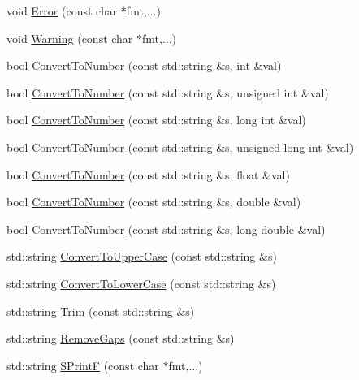 \begin{DoxyCompactItemize}
\item 
void \hyperlink{namespace_c_o_n_t_r_a_l_i_g_n_a61966034d786cea05ffcfaf94857102b}{Error} (const char $\ast$fmt,...)
\item 
void \hyperlink{namespace_c_o_n_t_r_a_l_i_g_n_ac0f0da01d76aab8602edcd2e4defc15f}{Warning} (const char $\ast$fmt,...)
\item 
bool \hyperlink{namespace_c_o_n_t_r_a_l_i_g_n_a7d8b6bc69c474546641aca733a1ba0db}{Convert\+To\+Number} (const std\+::string \&s, int \&val)
\item 
bool \hyperlink{namespace_c_o_n_t_r_a_l_i_g_n_a7da237d8ce22882695f3c123458b86cc}{Convert\+To\+Number} (const std\+::string \&s, unsigned int \&val)
\item 
bool \hyperlink{namespace_c_o_n_t_r_a_l_i_g_n_a35c60ce0193bd02ab62b2a7a88cf28f8}{Convert\+To\+Number} (const std\+::string \&s, long int \&val)
\item 
bool \hyperlink{namespace_c_o_n_t_r_a_l_i_g_n_a6329df40493ff670585d485a8fa113c8}{Convert\+To\+Number} (const std\+::string \&s, unsigned long int \&val)
\item 
bool \hyperlink{namespace_c_o_n_t_r_a_l_i_g_n_af5c3734e0fb093eab48cb799bae2aaf8}{Convert\+To\+Number} (const std\+::string \&s, float \&val)
\item 
bool \hyperlink{namespace_c_o_n_t_r_a_l_i_g_n_a3808e83d03092912e19aedeb45b7c691}{Convert\+To\+Number} (const std\+::string \&s, double \&val)
\item 
bool \hyperlink{namespace_c_o_n_t_r_a_l_i_g_n_a7c45f697e83f0391b2af6b0e75f6f62f}{Convert\+To\+Number} (const std\+::string \&s, long double \&val)
\item 
std\+::string \hyperlink{namespace_c_o_n_t_r_a_l_i_g_n_aac140f1a8b0d61744322cd54dac36ddd}{Convert\+To\+Upper\+Case} (const std\+::string \&s)
\item 
std\+::string \hyperlink{namespace_c_o_n_t_r_a_l_i_g_n_a806aa2763d439f3199f571482ccd7033}{Convert\+To\+Lower\+Case} (const std\+::string \&s)
\item 
std\+::string \hyperlink{namespace_c_o_n_t_r_a_l_i_g_n_a9c5b90dd5ac218f263563dbd70e46e3d}{Trim} (const std\+::string \&s)
\item 
std\+::string \hyperlink{namespace_c_o_n_t_r_a_l_i_g_n_a00a7058454c235c938fb00a1f320ad79}{Remove\+Gaps} (const std\+::string \&s)
\item 
std\+::string \hyperlink{namespace_c_o_n_t_r_a_l_i_g_n_adeab7a5e03007b720dd6a7dc7bffd7de}{S\+Print\+F} (const char $\ast$fmt,...)
\item 

\end{DoxyCompactItemize}
